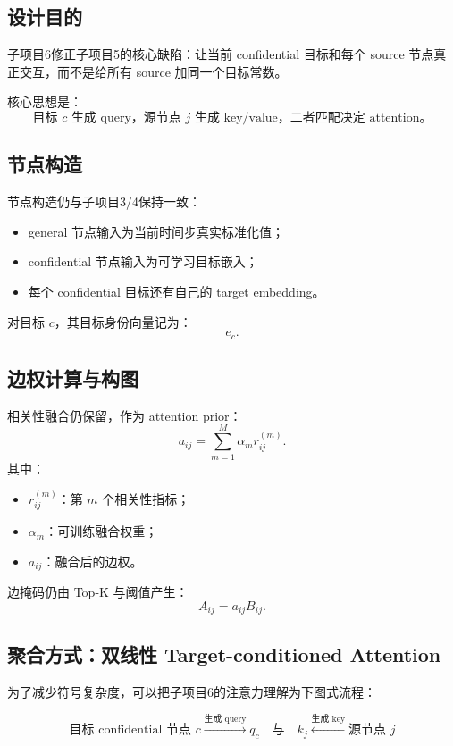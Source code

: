 \documentclass[UTF8]{ctexart}
\begin{document}
\subsection{设计目的}

子项目6修正子项目5的核心缺陷：让当前 confidential 目标和每个 source 节点真正交互，而不是给所有 source 加同一个目标常数。

核心思想是：
\[
\text{目标 } c \text{ 生成 query，源节点 } j \text{ 生成 key/value，二者匹配决定 attention。}
\]

\subsection{节点构造}

节点构造仍与子项目3/4保持一致：
\begin{itemize}
    \item general 节点输入为当前时间步真实标准化值；
    \item confidential 节点输入为可学习目标嵌入；
    \item 每个 confidential 目标还有自己的 target embedding。
\end{itemize}

对目标 \(c\)，其目标身份向量记为：
\[
e_c.
\]

\subsection{边权计算与构图}

相关性融合仍保留，作为 attention prior：
\[
a_{ij}=\sum_{m=1}^{M}\alpha_m r_{ij}^{(m)}.
\]
其中：
\begin{itemize}
    \item \(r_{ij}^{(m)}\)：第 \(m\) 个相关性指标；
    \item \(\alpha_m\)：可训练融合权重；
    \item \(a_{ij}\)：融合后的边权。
\end{itemize}

边掩码仍由 Top-K 与阈值产生：
\[
A_{ij}=a_{ij}B_{ij}.
\]

\subsection{聚合方式：双线性 Target-conditioned Attention}

为了减少符号复杂度，可以把子项目6的注意力理解为下图式流程：

\[
\boxed{\text{目标 confidential 节点 } c}
\xrightarrow{\text{生成 query}}
\boxed{q_c}
\quad
\text{与}
\quad
\boxed{k_j}
\xleftarrow{\text{生成 key}}
\boxed{\text{源节点 } j}
\]
\end{document}
